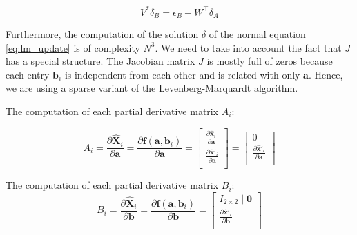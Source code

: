 \documentclass[11pt]{report}
\begin{document}
\begin{equation}
  V^\ast\delta_B = \epsilon_B - W^\top\delta_A
\end{equation} 


Furthermore, the computation of the solution $\delta$ of the normal equation \ref{eq:lm_update} is of complexity $N^3$. We need to take into account the fact that $J$ has a special structure. The Jacobian matrix $J$ is mostly full of zeros because each entry $\mathbf{b}_i$ is independent from each other and is related with only $\mathbf{a}$. Hence, we are using a sparse variant of the Levenberg-Marquardt algorithm.

The computation of each partial derivative matrix $A_i$:

\begin{equation}
A_i = \frac{\partial\widehat{\mathbf{X}}_i}{\partial\mathbf{a}} = \frac{\partial\mathbf{f}(\mathbf{a}, \mathbf{b}_i)}{\partial\mathbf{a}} = 
\left [ 
  \begin{matrix}
    \frac{\partial \widehat{\mathbf{x}}_i}{\partial\mathbf{a}} \\
    \frac{\partial \widehat{\mathbf{x}}'_i}{\partial\mathbf{a}} \\
  \end{matrix}
\right ]
= 
\left [ 
  \begin{matrix}
    0 \\
    \frac{\partial \widehat{\mathbf{x}}'_i}{\partial\mathbf{a}} \\
  \end{matrix}
\right ]
\end{equation}

The computation of each partial derivative matrix $B_i$:
\begin{equation}
B_i = \frac{\partial\widehat{\mathbf{X}}_i}{\partial\mathbf{b}} = \frac{\partial\mathbf{f}(\mathbf{a}, \mathbf{b}_i)}{\partial\mathbf{b}} =
 \left [ 
  \begin{matrix}
    I_{2\times 2} \mid \mathbf{0} \\
    \frac{\partial \widehat{\mathbf{x}}'_i}{\partial\mathbf{b}} \\
  \end{matrix}
\right ]
\end{equation}
\end{document}

